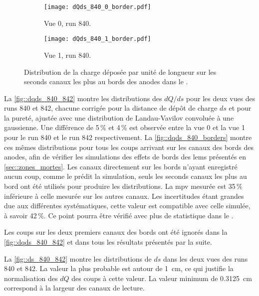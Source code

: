       \begin{figure}[htbp]
        \centering
        \begin{subfigure}[t]{0.48\textwidth}
          \centering
          \texttt{[image: dQds\_840\_0\_border.pdf]}
          \caption[]{Vue 0, run 840.}
        \end{subfigure}\hfill
        \begin{subfigure}[t]{0.48\textwidth}
          \centering
          \texttt{[image: dQds\_840\_1\_border.pdf]}
          \caption[]{Vue 1, run 840.}
        \end{subfigure}
        \caption[Distribution de la charge déposée par unité de longueur sur les seconds canaux les plus au bords des anodes dans le \TOO{}.]{\label{fig::dqds_840_borders}Distribution de la charge déposée par unité de longueur sur les seconds canaux les plus au bords des anodes dans le \TOO{}.}
      \end{figure}

      La \autoref{fig::dqds_840_842} montre les distributions des $dQ/ds$ pour les deux vues des runs 840 et 842, chacune corrigée pour la distance de dépôt de charge $ds$ et pour la pureté, ajustée avec une distribution de Landau-Vavilov convoluée à une gaussienne. Une différence de 5\,\% et 4\,\% est observée entre la vue 0 et la vue 1 pour le run 840 et le run 842 respectivement. La \autoref{fig::dqds_840_borders} montre ces mêmes distributions pour tous les coups arrivant sur les  canaux des bords des anodes, afin de vérifier les simulations des effets de bords des \glspl{lem} présentés en \autoref{sec::zones_mortes}. Les canaux directement sur les bords n'ayant enregistré aucun coup, comme le prédit la simulation, seuls les seconds canaux les plus au bord ont été utilisés pour produire les distributions. La \gls{mpv} mesurée est 35\,\% inférieure à celle mesurée sur les autres canaux. Les incertitudes étant grandes due aux différentes systématiques, cette valeur est compatible avec celle simulée, à savoir 42\,\%. Ce point pourra être vérifié avec plus de statistique dans le \SSS{}.

      Les coups sur les deux premiers canaux des bords ont été ignorés dans la \autoref{fig::dqds_840_842} et dans tous les résultats présentés par la suite.

      La \autoref{fig::ds_840_842} montre les distributions de $ds$ dans les deux vues des runs 840 et 842. La valeur la plus probable est autour de \SI{1}{\centi\meter}, ce qui justifie la normalisation des $dQ$ des coups à cette valeur. La valeur minimum de \SI{0.3125}{\centi\meter} correspond à la largeur des canaux de lecture.

